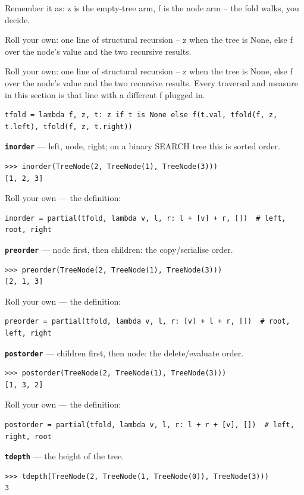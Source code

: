 \documentclass[10pt,letterpaper]{article}
\begin{document}
Remember it as: z is the empty-tree arm, f is the node arm -- the fold walks, you decide.


Roll your own: one line of structural recursion -- z when the tree is None, else f over the node's value and the two recursive results.


Roll your own: one line of structural recursion -- z when the tree is None, else f over the node's value and the two recursive results. Every traversal and measure in this section is that line with a different f plugged in.

\begin{lstlisting}[style=ex]
tfold = lambda f, z, t: z if t is None else f(t.val, tfold(f, z, t.left), tfold(f, z, t.right))
\end{lstlisting}
\textbf{\texttt{inorder}} --- left, node, right; on a binary SEARCH tree this is sorted order.
\begin{lstlisting}[style=ex]
>>> inorder(TreeNode(2, TreeNode(1), TreeNode(3)))
[1, 2, 3]
\end{lstlisting}

Roll your own --- the definition:

\begin{lstlisting}[style=ex]
inorder = partial(tfold, lambda v, l, r: l + [v] + r, [])  # left, root, right
\end{lstlisting}
\textbf{\texttt{preorder}} --- node first, then children: the copy/serialise order.
\begin{lstlisting}[style=ex]
>>> preorder(TreeNode(2, TreeNode(1), TreeNode(3)))
[2, 1, 3]
\end{lstlisting}

Roll your own --- the definition:

\begin{lstlisting}[style=ex]
preorder = partial(tfold, lambda v, l, r: [v] + l + r, [])  # root, left, right
\end{lstlisting}
\textbf{\texttt{postorder}} --- children first, then node: the delete/evaluate order.
\begin{lstlisting}[style=ex]
>>> postorder(TreeNode(2, TreeNode(1), TreeNode(3)))
[1, 3, 2]
\end{lstlisting}

Roll your own --- the definition:

\begin{lstlisting}[style=ex]
postorder = partial(tfold, lambda v, l, r: l + r + [v], [])  # left, right, root
\end{lstlisting}
\textbf{\texttt{tdepth}} --- the height of the tree.
\begin{lstlisting}[style=ex]
>>> tdepth(TreeNode(2, TreeNode(1, TreeNode(0)), TreeNode(3)))
3
\end{lstlisting}
\end{document}
